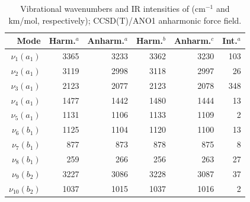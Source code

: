 \begin{table}[ht]

   \caption{Vibrational wavenumbers and IR intensities of \lin (cm$^{-1}$ and km/mol, respectively); CCSD(T)/ANO1 anharmonic force field.}
    \begin{center}
    \begin{tabular}{rrrrrr} \hline
    
        Mode & Harm.$^a$ & Anharm.$^a$ & Harm.$^b$ & Anharm.$^c$ & Int.$^a$ \\ \hline
        $\nu_{1}(a_1)$  & 3365  & 3233 & 3362 & 3230 & 103  \\ %
        $\nu_{2}(a_1)$  & 3119  & 2998 & 3118 & 2997 &  26  \\ %
        $\nu_{3}(a_1)$  & 2123  & 2077 & 2123 & 2078 & 348  \\ %
        $\nu_{4}(a_1)$  & 1477  & 1442 & 1480 & 1444 &  13  \\ %
        $\nu_{5}(a_1)$  & 1131  & 1106 & 1133 & 1109 &   2  \\ %
        $\nu_{6}(b_1)$  & 1125  & 1104 & 1120 & 1100 &  13  \\ %
        $\nu_{7}(b_1)$  &  877  &  873 &  878 &  875 &   8  \\ %
        $\nu_{8}(b_1)$  &  259  &  266 &  256 &  263 &  27  \\ %
        $\nu_{9}(b_2)$  & 3227  & 3086 & 3228 & 3087 &  37  \\ %
        $\nu_{10}(b_2)$ & 1037  & 1015 & 1037 & 1016 &   2  \\ %

\end{tabular}
\end{center}
\end{table}
